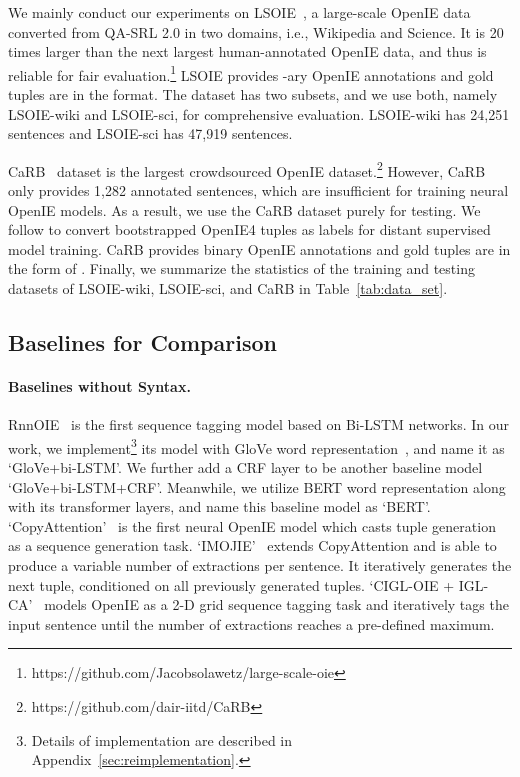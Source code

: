 \documentclass[11pt]{article}
\begin{document}
We mainly conduct our experiments on LSOIE~\cite{solawetz-larson-2021-lsoie}, a large-scale OpenIE data converted from QA-SRL 2.0 in two domains, i.e., Wikipedia and Science. It is 20 times larger than the next largest human-annotated OpenIE data, and thus is reliable for fair evaluation.\footnote{https://github.com/Jacobsolawetz/large-scale-oie}
LSOIE provides -ary OpenIE annotations and gold tuples are in the  format.
The dataset has two subsets, and we use both, namely LSOIE-wiki and LSOIE-sci, for comprehensive evaluation. LSOIE-wiki has 24,251 sentences and LSOIE-sci has 47,919 sentences.

CaRB~\cite{bhardwaj2019carb} dataset is the largest crowdsourced OpenIE dataset.\footnote{https://github.com/dair-iitd/CaRB} 
However, CaRB only provides 1,282 annotated sentences, which are insufficient for training neural OpenIE models.
As a result, we use the CaRB dataset purely for testing. We follow \citet{kolluru2020openie6} to convert bootstrapped OpenIE4 tuples as labels for distant supervised model training.
CaRB provides binary OpenIE annotations and gold tuples are in the form of .
Finally, we summarize the statistics of the training and testing datasets of LSOIE-wiki, LSOIE-sci, and CaRB in Table~\ref{tab:data_set}.


\subsection{Baselines for Comparison}
\paragraph{Baselines without Syntax.} RnnOIE~\cite{stanovsky2018supervised} is the first sequence tagging model based on Bi-LSTM networks. In our work, we implement\footnote{Details of implementation are described in Appendix~\ref{sec:reimplementation}.} its model with GloVe word representation~\cite{pennington-etal-2014-glove}, and name it as `GloVe+bi-LSTM'. We further add a CRF layer to be another baseline model `GloVe+bi-LSTM+CRF'. Meanwhile, we utilize BERT word representation along with its transformer layers, and name this baseline model as `BERT'. `CopyAttention'~\cite{cui2018neural} is the first neural OpenIE model which casts tuple generation as a sequence generation task. `IMOJIE'~\cite{kolluru2020imojie} extends CopyAttention and is able to produce a variable number of extractions per sentence. It iteratively generates the next tuple, conditioned on all previously generated tuples. `CIGL-OIE + IGL-CA'~\cite{kolluru2020openie6} models OpenIE as a 2-D grid sequence tagging task and iteratively tags the input sentence until the number of extractions reaches a pre-defined maximum.
\end{document}
